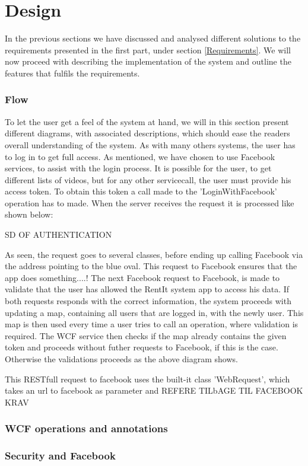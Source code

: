 \part{Design}
In the previous sections we have discussed and analysed different solutions to the requirements presented in the first part, under section \ref{Requirements}. We will now proceed with describing the implementation of the system and outline the features that fulfils the requirements.

\section{Flow}
To let the user get a feel of the system at hand, we will in this section present different diagrams, with associated descriptions, which should ease the readers overall understanding of the system.
As with many others systems, the user has to log in to get full access. As mentioned, we have chosen to use Facebook services, to assist with the login process. It is possible for the user, to get different lists of videos, but for any other servicecall, the user must provide his access token. To obtain this token a call made to the 'LoginWithFacebook' operation has to made. When the server receives the request it is processed like shown below:

SD OF AUTHENTICATION

As seen, the request goes to several classes, before ending up calling Facebook via the address pointing to the blue oval. This request to Facebook ensures that the app does something....!
The next Facebook request to Facebook, is made to validate that the user has allowed the RentIt system app to access his data. If both requests responds with the correct information, the system proceeds with updating a map, containing all users that are logged in, with the newly user. This map is then used every time a user tries to call an operation, where validation is required. The WCF service then checks if the map already contains the given token and proceeds without futher requests to Facebook, if this is the case. Otherwise the validations proceeds as the above diagram shows.  


This RESTfull request to facebook uses the built-it class 'WebRequest', which takes an url to facebook as parameter and 
REFERE TILbAGE TIL FACEBOOK KRAV

\section{WCF operations and annotations}


\section{Security and Facebook}

